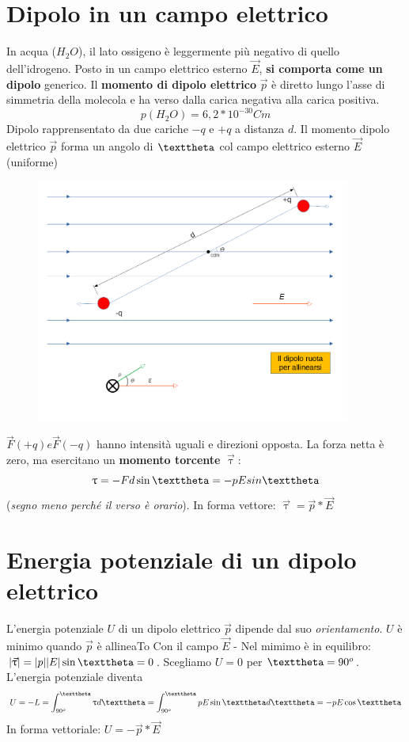 \documentclass{book}
\newcommand{\abs}[1]{\lvert#1\rvert}
\begin{document}
\section{Dipolo in un campo elettrico}
In acqua ($H_2O$), il lato ossigeno è leggermente più negativo di quello dell'idrogeno. Posto in un campo
elettrico esterno $\vec{E}$, \textbf{si comporta come un dipolo} generico. Il \textbf{momento di dipolo elettrico} $\vec{p}$ è diretto lungo l'asse di simmetria della molecola e ha verso dalla carica negativa alla carica positiva.
\begin{equation}
  p(H_2O)=6,2*10^{-30}Cm
\end{equation}
Dipolo rapprensentato da due cariche $-q$ e $+q$ a distanza $d$. Il momento dipolo elettrico
$\vec{p}$ forma un angolo di $\texttheta$ col campo elettrico esterno $\vec{E}$ (uniforme)\\
\begin{figure}[!h]
 	\centering
	\includegraphics[height=8cm]{img/grafuci del dipolo elettrico.png}
\end{figure}
$\vec{F} (+q) e \vec{F} (-q)$ hanno intensità uguali e direzioni opposta. La forza netta è zero, ma esercitano un \textbf{momento torcente} $\vec{\uptau}$:
\begin{equation}
\uptau=-Fd \sin {\texttheta} = -pE sin {\texttheta}
\end{equation}
(\textit{segno meno perché il verso è orario}).
In forma vettore: $\vec{\uptau}=\vec{p}*\vec{E}$
\section{Energia potenziale di un dipolo elettrico}
L'energia potenziale $U$ di un dipolo elettrico $\vec{p}$ dipende dal suo \textit{orientamento}.
$U$ è minimo quando $\vec{p}$ è allineaTo Con il campo $\vec{E}$ - Nel mimimo è in equilibro:
$\abs{\vec{\uptau}}=\abs{p}\abs{E}\sin \texttheta=0$. Scegliamo $U=0$ per $\texttheta=90^o$.\\
L'energia potenziale diventa
\begin{equation}
  U=-L=\int^{\texttheta}_{90^o}\uptau d \texttheta= \int_{90^o}^\texttheta pE\sin \texttheta d\texttheta =-pE\cos\texttheta
\end{equation}
In forma vettoriale: $U=-\vec{p}*\vec{E}$
\end{document}
